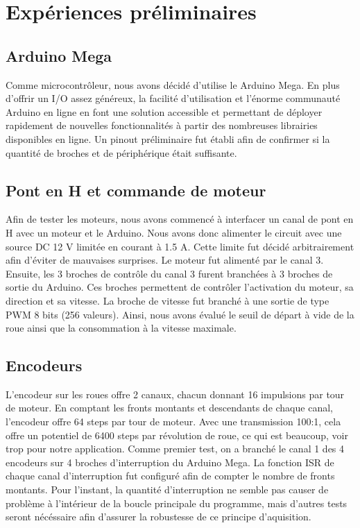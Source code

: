 \chapter{Expériences préliminaires}

\section{Arduino Mega}

Comme microcontrôleur, nous avons décidé d'utilise le Arduino Mega. En plus d'offrir un I/O assez généreux, la facilité d'utilisation et l'énorme communauté Arduino en ligne
en font une solution accessible et permettant de déployer rapidement de nouvelles fonctionnalités à partir des nombreuses librairies disponibles en ligne. Un pinout préliminaire fut
établi afin de confirmer si la quantité de broches et de périphérique était suffisante.

\section{Pont en H et commande de moteur}

Afin de tester les moteurs, nous avons commencé à interfacer un canal de pont en H avec un moteur et le Arduino. Nous avons donc alimenter le circuit avec une source DC 12 V
limitée en courant à 1.5 A. Cette limite fut décidé arbitrairement afin d'éviter de mauvaises surprises. Le moteur fut alimenté par le canal 3. Ensuite, les 3 broches de
contrôle du canal 3 furent branchées à 3 broches de sortie du Arduino. Ces broches permettent de contrôler l'activation du moteur, sa direction et sa vitesse.
La broche de vitesse fut branché à une sortie de type PWM 8 bits (256 valeurs). Ainsi, nous avons évalué le seuil de départ à vide de la roue ainsi que la consommation à la vitesse maximale.

\section{Encodeurs}

L'encodeur sur les roues offre 2 canaux, chacun donnant 16 impulsions par tour de moteur. En comptant les fronts montants et descendants de chaque canal,
l'encodeur offre 64 steps par tour de moteur. Avec une transmission 100:1, cela offre un potentiel de 6400 steps par révolution de roue, ce qui est beaucoup,
voir trop pour notre application.  Comme premier test, on a branché le canal 1 des 4 encodeurs sur 4 broches d'interruption du Arduino Mega. La fonction ISR de
chaque canal d'interruption fut configuré afin de compter le nombre de fronts montants. Pour l'instant, la quantité d'interruption ne semble pas causer de problème
à l'intérieur de la boucle principale du programme, mais d'autres tests seront nécéssaire afin d'assurer la robustesse de ce principe d'aquisition.

